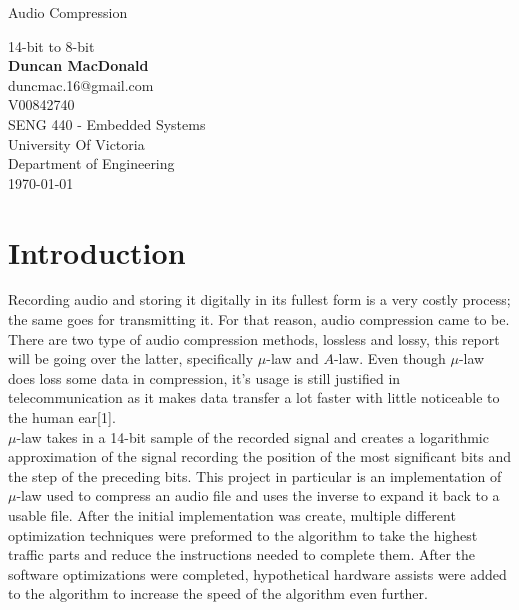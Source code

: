 \documentclass[12pt]{article}
\begin{document}
\begin{titlepage}

\begin{center}
\begin{huge}
Audio Compression\\
\end{huge}
14-bit to 8-bit\\
\vspace{1.5cm}
\textbf{Duncan MacDonald}\\
duncmac.16@gmail.com\\
V00842740\\
\vfill
SENG 440 - Embedded Systems\\
University Of Victoria\\
Department of Engineering\\
\vspace{1.5cm}
\today
\end{center}
\end{titlepage}
\newpage
\tableofcontents
\listoffigures
\newpage
\section{Introduction}
\indent 
Recording audio and storing it digitally in its fullest form is a very costly process; the same goes for transmitting it. For that reason, audio compression came to be. There are two type of audio compression methods, lossless and lossy, this report will be going over the latter, specifically $\mu$-law and $A$-law. Even though $\mu$-law does loss some data in compression, it's usage is still justified in telecommunication as it makes data transfer a lot faster with little noticeable to the human ear[1].\\

$\mu$-law takes in a 14-bit sample of the recorded signal and creates a logarithmic approximation of the signal recording the position of the most significant bits and the step of the preceding bits. This project in particular is an implementation of $\mu$-law used to compress an audio file and uses the inverse to expand it back to a usable file. After the initial implementation was create, multiple different optimization techniques were preformed to the algorithm to take the highest traffic parts and reduce the instructions needed to complete them. After the software optimizations were completed, hypothetical hardware assists were added to the algorithm to increase the speed of the algorithm even further.\\
\end{document}
